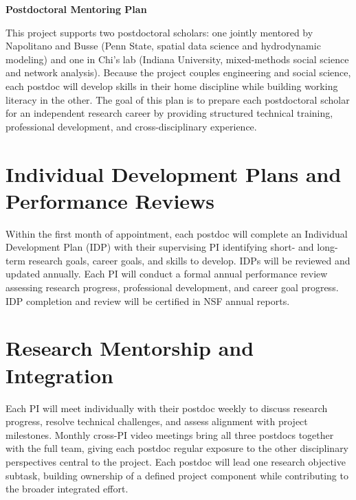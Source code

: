 \documentclass[11pt]{article}
\begin{document}
\pagestyle{empty}

\begin{center}
\textbf{Postdoctoral Mentoring Plan}
\end{center}

\vspace{-0.5cm}

\noindent This project supports two postdoctoral scholars: one jointly mentored by Napolitano and Busse (Penn State, spatial data science and hydrodynamic modeling) and one in Chi's lab (Indiana University, mixed-methods social science and network analysis). Because the project couples engineering and social science, each postdoc will develop skills in their home discipline while building working literacy in the other.
The goal of this plan is to prepare each postdoctoral scholar for an
independent research career by providing structured technical training,
professional development, and cross-disciplinary experience.
\vspace{-0.5cm}
\section*{Individual Development Plans and Performance Reviews} Within the first month of appointment, each postdoc will complete an
Individual Development Plan (IDP) with their supervising PI identifying
short- and long-term research goals, career goals, and skills to develop.
IDPs will be reviewed and updated annually. Each PI will conduct a formal
annual performance review assessing research progress, professional
development, and career goal progress. IDP completion and review will be
certified in NSF annual reports.
\vspace{-0.5cm}
\section*{Research Mentorship and Integration} Each PI will meet individually with their postdoc weekly to discuss research
progress, resolve technical challenges, and assess alignment with project
milestones. Monthly cross-PI video meetings bring all three postdocs together
with the full team, giving each postdoc regular exposure to the other
disciplinary perspectives central to the project. Each postdoc will lead
one research objective subtask, building ownership of a defined project
component while contributing to the broader integrated effort.
\vspace{-0.5cm}
\end{document}
